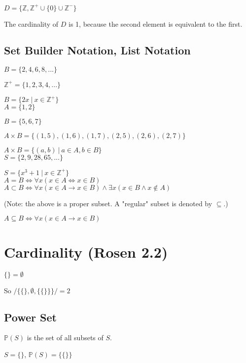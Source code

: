 \documentclass[english,openany]{book}
\begin{document}
	$D = \{\mathbb Z, \mathbb Z^+ \cup \{0\} \cup \mathbb Z^- \}$

	The cardinality of $D$ is 1, because the second element is equivalent to the first.\newline

	\noindent
	\subsection{Set Builder Notation, List Notation}

	$B = \{2,4,6,8,...\}$

	$\mathbb Z^+ = \{ 1,2,3,4,... \}$

	$B = \{ 2x \ | \ x \in \mathbb Z^+\}$ \\

	$A = \{1,2\}$

	$B = \{5,6,7\}$

	$A \times B = \{ (1,5),(1,6),(1,7),(2,5),(2,6),(2,7) \}$

	$A \times B = \{ (a,b) \ |\ a \in A, b \in B \}$\\

	$S = \{2,9,28,65,...\}$

	$S = \{ x^3 + 1 \ | \ x \in \mathbb Z^+ \}$\\

	$A = B \iff \forall x (x \in A \iff x \in B)$\\

	$A \subset B \iff \forall x (x \in A \rightarrow x \in B) \wedge \exists x (x \in B \wedge x \not\in A)$

	(Note: the above is a proper subset. A "regular" subset is denoted by $\subseteq$.)

	$A \subseteq B \iff \forall x (x \in A \rightarrow x \in B)$

	\section{Cardinality (Rosen 2.2)}

	$\{\} = \emptyset$

	So $/\{ \{\}, \emptyset, \{\{\}\} \}/ = 2$\\

	\subsection{Power Set}

	$\mathbb P (S)$ is the set of all subsets of $S$.

	$S = \{\}$, $\mathbb P (S) = \{ \{ \} \}$
\end{document}

